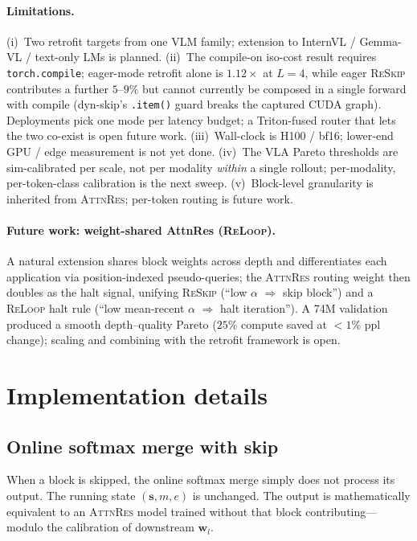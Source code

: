 \documentclass{article}
\newcommand{\attnres}{\textsc{AttnRes}}
\newcommand{\reskip}{\textsc{ReSkip}}
\newcommand{\reloop}{\textsc{ReLoop}}
\begin{document}
\paragraph{Limitations.}
(i)~Two retrofit targets from one VLM family; extension to InternVL / Gemma-VL / text-only LMs is planned. (ii)~The compile-on iso-cost result requires \texttt{torch.compile}; eager-mode retrofit alone is $1.12\times$ at $L{=}4$, while eager \reskip{} contributes a further $5$--$9\%$ but cannot currently be composed in a single forward with compile (dyn-skip's \texttt{.item()} guard breaks the captured CUDA graph). Deployments pick one mode per latency budget; a Triton-fused router that lets the two co-exist is open future work. (iii)~Wall-clock is H100 / bf16; lower-end GPU / edge measurement is not yet done. (iv)~The VLA Pareto thresholds are sim-calibrated per scale, not per modality \emph{within} a single rollout; per-modality, per-token-class calibration is the next sweep. (v)~Block-level granularity is inherited from \attnres{}; per-token routing is future work.

\paragraph{Future work: weight-shared AttnRes (\reloop{}).}
A natural extension shares block weights across depth and differentiates each application via position-indexed pseudo-queries; the \attnres{} routing weight then doubles as the halt signal, unifying \reskip{} (``low $\alpha$ $\Rightarrow$ skip block'') and a \reloop{} halt rule (``low mean-recent $\alpha$ $\Rightarrow$ halt iteration''). A 74M validation produced a smooth depth--quality Pareto ($25\%$ compute saved at $<1\%$ ppl change); scaling and combining with the retrofit framework is open.

\section{Implementation details}
\label{app:implementation}

\subsection{Online softmax merge with skip}
When a block is skipped, the online softmax merge simply does not process its output. The running state $(\mathbf{s}, m, e)$ is unchanged. The output is mathematically equivalent to an \attnres{} model trained without that block contributing---modulo the calibration of downstream $\mathbf{w}_l$.
\end{document}
